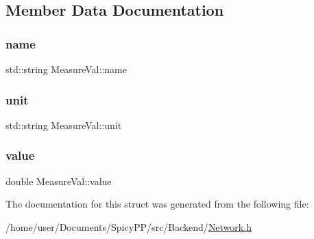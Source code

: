\subsection{Member Data Documentation}
\mbox{\label{structMeasureVal_a9f56f01e20f665558fb0fd68bd2f1dd1}} 
\subsubsection{\texorpdfstring{name}{name}}
{\footnotesize\ttfamily std\+::string Measure\+Val\+::name}

\mbox{\label{structMeasureVal_a1510e76f94aac1d2c563f6559cdf7fee}} 
\subsubsection{\texorpdfstring{unit}{unit}}
{\footnotesize\ttfamily std\+::string Measure\+Val\+::unit}

\mbox{\label{structMeasureVal_a4fe869c645268312381b156ac1b42683}} 
\subsubsection{\texorpdfstring{value}{value}}
{\footnotesize\ttfamily double Measure\+Val\+::value}



The documentation for this struct was generated from the following file\+:\begin{DoxyCompactItemize}
\item 
/home/user/\+Documents/\+Spicy\+P\+P/src/\+Backend/\hyperlink{Network_8h}{Network.\+h}\end{DoxyCompactItemize}
